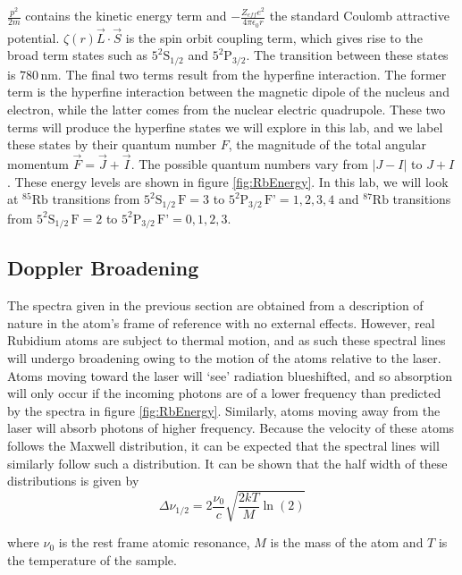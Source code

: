 \documentclass[12pt]{article}
\begin{document}
$\frac{p^2}{2m}$ contains the kinetic energy term and $- \frac{Z_{eff} e^2}{4 \pi \epsilon_0 r}$ the standard Coulomb attractive potential.  $\zeta(r) \vec{L}\cdot \vec{S}$ is the spin orbit coupling term, which gives rise to the broad term states such as $5^2\text{S}_{1/2}$ and $5^2\text{P}_{3/2}$.  The transition between these states is $780\,\text{nm}$.  The final two terms result from the hyperfine interaction.  The former term is the hyperfine interaction between the magnetic dipole of the nucleus and electron, while the latter comes from the nuclear electric quadrupole.  These two terms will produce the hyperfine states we will explore in this lab, and we label these states by their quantum number $F$, the magnitude of the total angular momentum $\vec{F} = \vec{J} + \vec{I}$.  The possible quantum numbers vary from $\rvert J-I\rvert$ to $J+I$.  These energy levels are shown in figure \ref{fig:RbEnergy}.  In this lab, we will look at ${}^{85}\text{Rb}$ transitions from $5^2\text{S}_{1/2}\,\text{F}=3$ to $5^2\text{P}_{3/2}\, \text{F'}=1,2,3,4$ and ${}^{87}\text{Rb}$ transitions from $5^2\text{S}_{1/2}\,\text{F}=2$ to $5^2\text{P}_{3/2}\, \text{F'}=0,1,2,3$.



\subsection*{Doppler Broadening}

The spectra given in the previous section are obtained from a description of nature in the atom's frame of reference with no external effects.  However, real Rubidium atoms are subject to thermal motion, and as such these spectral lines will undergo broadening owing to the motion of the atoms relative to the laser.  Atoms moving toward the laser will `see' radiation blueshifted, and so absorption will only occur if the incoming photons are of a lower frequency than predicted by the spectra in figure \ref{fig:RbEnergy}.  Similarly, atoms moving away from the laser will absorb photons of higher frequency.  Because the velocity of these atoms follows the Maxwell distribution, it can be expected that the spectral lines will similarly follow such a distribution.  It can be shown that the half width of these distributions is given by 
$$\Delta \nu_{1/2} = 2\frac{\nu_0}{c}\sqrt{\frac{2kT}{M}\ln(2)}$$

where $\nu_0$ is the rest frame atomic resonance, $M$ is the mass of the atom and $T$ is the temperature of the sample.
\end{document}
